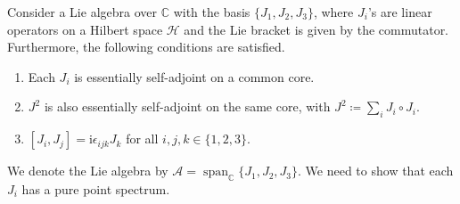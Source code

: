 \documentclass[12pt, a4 paper]{article}
\theoremstyle{definition}
\newcommand{\cc}{\mathbb{C}}
\newcommand{\hilbert}{\mathcal{H}}
\renewcommand{\i}{\mathrm{i}}
\DeclareMathOperator{\spann}{span}
\begin{document}
	Consider a Lie algebra over \(\cc\) with the basis \(\{J_1, J_2, J_3\}\), where \(J_i\)'s are linear operators on a Hilbert space \(\hilbert\) and the Lie bracket is given by the commutator. Furthermore, the following conditions are satisfied.
	\begin{enumerate}
		\item Each \(J_i\) is essentially self-adjoint on a common core.
		\item \(J^2\) is also essentially self-adjoint on the same core, with \(J^2 \coloneq \sum_i J_i \circ J_i\).
		\item \([J_i, J_j] = \i \epsilon_{ijk} J_k\) for all \(i, j, k \in \{1, 2, 3\}\).
	\end{enumerate}
	We denote the Lie algebra by \(\mathcal{A} = \spann_{\cc}\{J_1, J_2, J_3\}\). We need to show that each \(J_i\) has a pure point spectrum.
\end{document}

